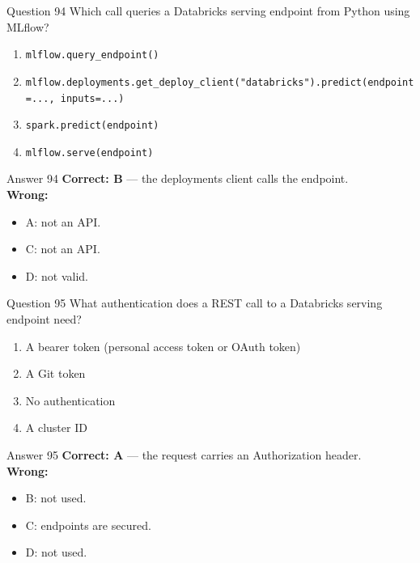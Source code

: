 \documentclass[aspectratio=169,11pt]{beamer}
\begin{document}
\begin{frame}{Question 94}
Which call queries a Databricks serving endpoint from Python using MLflow?
\begin{enumerate}[label=\Alph*.]
\item \texttt{mlflow.query\_endpoint()}
\item \texttt{mlflow.deployments.get\_deploy\_client("databricks").predict(endpoint=..., inputs=...)}
\item \texttt{spark.predict(endpoint)}
\item \texttt{mlflow.serve(endpoint)}
\end{enumerate}
\end{frame}
\begin{frame}{Answer 94}
\textbf{Correct: B} --- the deployments client calls the endpoint.\\
\vspace{0.5em}
\textbf{Wrong:}
\begin{itemize}
\item A: not an API.
\item C: not an API.
\item D: not valid.
\end{itemize}
\end{frame}

\begin{frame}{Question 95}
What authentication does a REST call to a Databricks serving endpoint need?
\begin{enumerate}[label=\Alph*.]
\item A bearer token (personal access token or OAuth token)
\item A Git token
\item No authentication
\item A cluster ID
\end{enumerate}
\end{frame}
\begin{frame}{Answer 95}
\textbf{Correct: A} --- the request carries an Authorization header.\\
\vspace{0.5em}
\textbf{Wrong:}
\begin{itemize}
\item B: not used.
\item C: endpoints are secured.
\item D: not used.
\end{itemize}
\end{frame}
\end{document}
